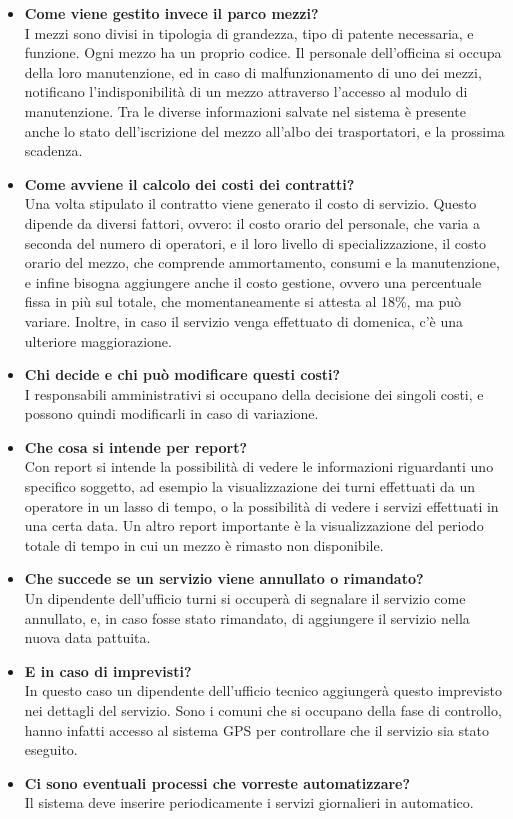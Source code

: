 \documentclass[green, fancy, 11pt]{elegantbook}
\begin{document}
\begin{itemize}
	\item \textbf{Come viene gestito invece il parco mezzi?}\\
	I mezzi sono divisi in tipologia di grandezza, tipo di patente necessaria, e funzione. Ogni mezzo ha un proprio codice.
	Il personale dell'officina si occupa della loro manutenzione, ed in caso di malfunzionamento di uno dei mezzi, notificano l'indisponibilità di un mezzo attraverso l'accesso al modulo di manutenzione. Tra le diverse informazioni salvate nel sistema è presente anche lo stato dell'iscrizione del mezzo all'albo dei trasportatori, e la prossima scadenza.
	
	\item \textbf{Come avviene il calcolo dei costi dei contratti?}\\
	Una volta stipulato il contratto viene generato il costo di servizio. Questo dipende da diversi fattori, ovvero: il costo orario del personale, che varia a seconda del numero di operatori, e il loro livello di specializzazione, il costo orario del mezzo, che comprende ammortamento, consumi e la manutenzione, e infine bisogna aggiungere anche il costo gestione, ovvero una percentuale fissa in più sul totale, che momentaneamente si attesta al 18\%, ma può variare. Inoltre, in caso il servizio venga effettuato di domenica, c'è una ulteriore maggiorazione.
	
	\item \textbf{Chi decide e chi può modificare questi costi?}\\
	I responsabili amministrativi si occupano della decisione dei singoli costi, e possono quindi modificarli in caso di variazione.
	
	\item \textbf{Che cosa si intende per report?}\\
	Con report si intende la possibilità di vedere le informazioni riguardanti uno specifico soggetto, ad esempio la visualizzazione dei turni effettuati da un operatore in un lasso di tempo, o la possibilità di vedere i servizi effettuati in una certa data. Un altro report importante è la visualizzazione del periodo totale di tempo in cui un mezzo è rimasto non disponibile.
	
	\item \textbf{Che succede se un servizio viene annullato o rimandato?}\\
	Un dipendente dell'ufficio turni si occuperà di segnalare il servizio come annullato, e, in caso fosse stato rimandato, di aggiungere il servizio nella nuova data pattuita.
	
	\item \textbf{E in caso di imprevisti?}\\
	In questo caso un dipendente dell'ufficio tecnico aggiungerà questo imprevisto nei dettagli del servizio. Sono i comuni che si occupano della fase di controllo, hanno infatti accesso al sistema GPS per controllare che il servizio sia stato eseguito.
	
	\item \textbf{Ci sono eventuali processi che vorreste automatizzare?}\\
	Il sistema deve inserire periodicamente i servizi giornalieri in automatico.
\end{itemize}
\end{document}
